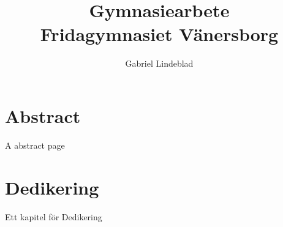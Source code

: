 \documentclass{report}
\title{Gymnasiearbete \\
{\Large Fridagymnasiet Vänersborg}}
\author{Gabriel Lindeblad}
\begin{document}
\maketitle

\chapter*{Abstract}
A abstract page

\chapter*{Dedikering}
Ett kapitel för Dedikering














\end{document}
